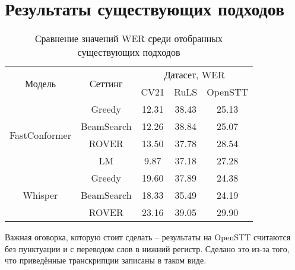 \section{Результаты существующих подходов}

\begin{table}[]
\centering
\caption{Сравнение значений WER среди отобранных существующих подходов}
\begin{tabular}{|c|c|ccc|}
\hline
\multirow{2}{*}{Модель}        & \multirow{2}{*}{Сеттинг}             & \multicolumn{3}{c|}{Датасет, WER}                                    \\ \cline{3-5} 
                               &                                      & \multicolumn{1}{c|}{CV21}  & \multicolumn{1}{c|}{RuLS}     & OpenSTT \\ \hline
\multirow{4}{*}{FastConformer} & Greedy                               & \multicolumn{1}{c|}{12.31} & \multicolumn{1}{c|}{38.43}    & 25.13   \\ \cline{2-5} 
                               & BeamSearch                           & \multicolumn{1}{c|}{12.26} & \multicolumn{1}{c|}{38.84}    & 25.07   \\ \cline{2-5}
                               & ROVER                                & \multicolumn{1}{c|}{13.50} & \multicolumn{1}{c|}{37.78}    & 28.54   \\ \cline{2-5}
                               & LM                                   & \multicolumn{1}{c|}{9.87}  & \multicolumn{1}{c|}{37.18}    & 27.28   \\ \hline 
\multirow{3}{*}{Whisper}       & Greedy                               & \multicolumn{1}{c|}{19.60} & \multicolumn{1}{c|}{37.89}    & 24.38   \\ \cline{2-5} 
                               & BeamSearch                           & \multicolumn{1}{c|}{18.33} & \multicolumn{1}{c|}{35.49}    & 24.19   \\ \cline{2-5}
                               & ROVER                                & \multicolumn{1}{c|}{23.16} & \multicolumn{1}{c|}{39.05}    & 29.90   \\ \hline
                               
\end{tabular}
\label{tab:res_base}
\end{table}

Важная оговорка, которую стоит сделать -- результаты на OpenSTT считаются без пунктуации и с переводом слов в нижний регистр.
Сделано это из-за того, что приведённые транскрипции записаны в таком виде.

